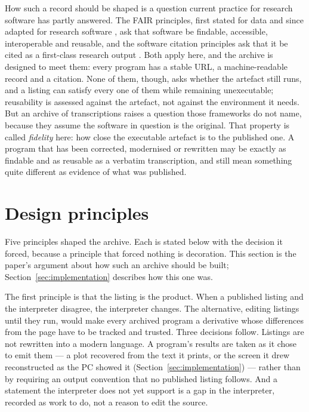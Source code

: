 How such a record should be shaped is a question current practice for research software has partly answered. The FAIR principles, first stated for data \citep{wilkinson2016} and since adapted for research software \citep{barker2022}, ask that software be findable, accessible, interoperable and reusable, and the software citation principles ask that it be cited as a first-class research output \citep{smith2016}. Both apply here, and the archive is designed to meet them: every program has a stable URL, a machine-readable record and a citation. None of them, though, asks whether the artefact still runs, and a listing can satisfy every one of them while remaining unexecutable; reusability is assessed against the artefact, not against the environment it needs. But an archive of transcriptions raises a question those frameworks do not name, because they assume the software in question is the original. That property is called \emph{fidelity} here: how close the executable artefact is to the published one. A program that has been corrected, modernised or rewritten may be exactly as findable and as reusable as a verbatim transcription, and still mean something quite different as evidence of what was published.


\section{Design principles}
\label{sec:design}

Five principles shaped the archive. Each is stated below with the decision it forced, because a principle that forced nothing is decoration. This section is the paper's argument about how such an archive should be built; Section~\ref{sec:implementation} describes how this one was.

The first principle is that the listing is the product. When a published listing and the interpreter disagree, the interpreter changes. The alternative, editing listings until they run, would make every archived program a derivative whose differences from the page have to be tracked and trusted. Three decisions follow. Listings are not rewritten into a modern language. A program's results are taken as it chose to emit them --- a plot recovered from the text it prints, or the screen it drew reconstructed as the PC showed it (Section~\ref{sec:implementation}) --- rather than by requiring an output convention that no published listing follows. And a statement the interpreter does not yet support is a gap in the interpreter, recorded as work to do, not a reason to edit the source.

